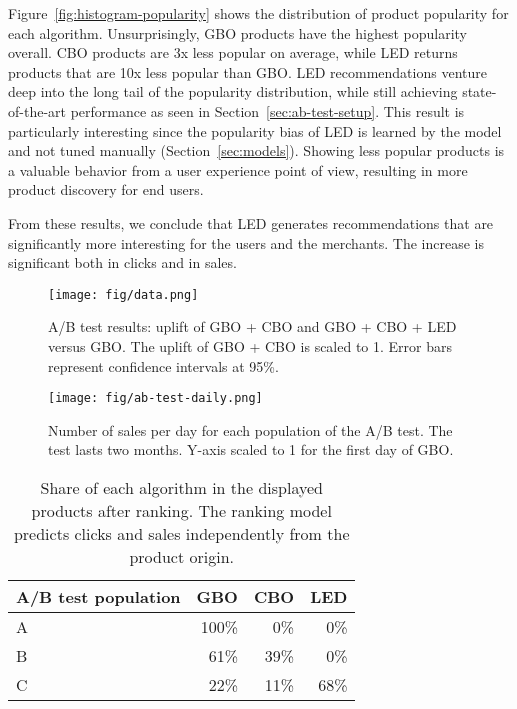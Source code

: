 \documentclass[sigconf]{acmart}
\begin{document}
Figure~\ref{fig:histogram-popularity} shows the distribution of product popularity for each algorithm. Unsurprisingly, GBO products have the highest popularity overall. CBO products are 3x less popular on average, while LED returns products that are 10x less popular than GBO. LED recommendations venture deep into the long tail of the popularity distribution, while still achieving state-of-the-art performance as seen in Section~\ref{sec:ab-test-setup}. This result is particularly interesting since the popularity bias of LED is learned by the model and not tuned manually (Section~\ref{sec:models}). Showing less popular products is a valuable behavior from a user experience point of view, resulting in more product discovery for end users.

From these results, we conclude that LED generates recommendations that are significantly more interesting for the users and the merchants. The increase is significant both in clicks and in sales.

 \begin{figure}[h]
    \centering
    \texttt{[image: fig/data.png]}
    \caption{A/B test results: uplift of GBO + CBO and GBO + CBO + LED versus GBO.  The uplift of GBO + CBO is scaled to 1. Error bars represent confidence intervals at 95\%.}
    \label{fig:ab-test-results}
\end{figure}

\begin{figure}[h]
    \centering
    \texttt{[image: fig/ab-test-daily.png]}
    \caption{Number of sales per day for each population of the A/B test. The test lasts two months. Y-axis scaled to 1 for the first day of GBO.}
    \label{fig:ab-test-results-daily}
\end{figure}

\begin{table}[h]
\centering
\caption{Share of each algorithm in the displayed products after ranking. The ranking model predicts clicks and sales independently from the product origin.}
\begin{tabularx}{.4\textwidth}{|X|r|r|r|}
  \hline
   A/B test population & GBO & CBO & LED \\
    \hline
  A & 100\%  & 0\% & 0\%  \\
  \hline
  B & 61\%  & 39\% & 0\%  \\
   \hline
  C  & 22\%  & 11\% & 68\% \\
    \hline
    \end{tabularx}
\label{table:source-share-of-voice}
\end{table}
\end{document}
